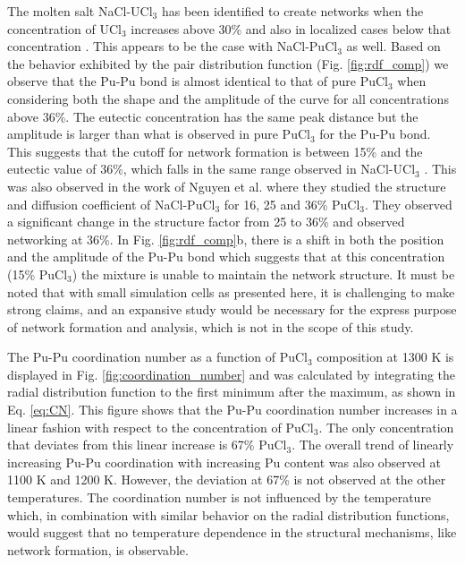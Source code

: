 \documentclass[review]{elsarticle}
\providecommand{\DIFaddtex}[1]{{\protect\color{blue} \sf #1}} %
\providecommand{\DIFaddbegin}{} %
\providecommand{\DIFaddend}{} %
\providecommand{\DIFadd}[1]{\texorpdfstring{\DIFaddtex{#1}}{#1}} %
\newcommand{\DIFaddincludegraphics}[2][]{{\color{blue}\fbox{\DIFOincludegraphics[#1]{#2}}}} %
\DeclareRobustCommand{\DIFaddbegin}{\DIFOaddbegin \let\includegraphics\DIFaddincludegraphics} %
\DeclareRobustCommand{\DIFaddend}{\DIFOaddend \let\includegraphics\DIFOincludegraphics} %
\begin{document}
The molten salt NaCl-UCl$_3$ has been identified to create networks when the concentration of UCl$_3$ increases above 30\% and also in localized cases below that concentration \cite{li2019first}. This appears to be the case with NaCl-PuCl$_3$ as well. Based on the behavior exhibited by the pair distribution function (Fig. \ref{fig:rdf_comp}) we observe that the Pu-Pu bond is almost identical to that of pure PuCl$_3$ when considering both the shape and the amplitude of the curve for all concentrations above 36\%. The eutectic concentration has the same peak distance but the amplitude is larger than what is observed in pure PuCl$_3$ for the Pu-Pu bond. This suggests that the cutoff for network formation is between 15\% and the eutectic value of 36\%, which falls in the same range observed in NaCl-UCl$_3$ \cite{ANDERSSON2022153836}. \DIFaddbegin \DIFadd{This was also observed in the work of Nguyen et al. \cite{NGUYEN2023101951} where they studied the structure and diffusion coefficient of NaCl-PuCl$_3$ for 16, 25 and 36\% PuCl$_3$. They observed a significant change in the structure factor from 25 to 36\% and observed networking at 36\%. }\DIFaddend In Fig. \ref{fig:rdf_comp}b, there is a shift in both the position and the amplitude of the Pu-Pu bond which suggests that at this concentration (15\% PuCl$_3$) the mixture is unable to maintain the network structure. It must be noted that with small simulation cells as presented here, it is challenging to make strong claims, and an expansive study would be necessary for the express purpose of network formation and analysis, which is not in the scope of this study. 

The Pu-Pu coordination number as a function of PuCl$_3$ composition at 1300 K is displayed in Fig. \ref{fig:coordination_number} and was calculated by integrating the radial distribution function to the first minimum after the maximum, as shown in Eq. \ref{eq:CN}. This figure shows that the Pu-Pu coordination number increases in a linear fashion with respect to the concentration of PuCl$_3$. The only concentration that deviates from this linear increase is 67\% PuCl$_3$. The overall trend of linearly increasing Pu-Pu coordination with increasing Pu content was also observed at 1100 K and 1200 K. However, the deviation at 67\% is not observed at the other temperatures. The coordination number is not influenced by the temperature which, in combination with similar behavior on the radial distribution functions, would suggest that no temperature dependence in the structural mechanisms, like network formation, is observable.
\end{document}
